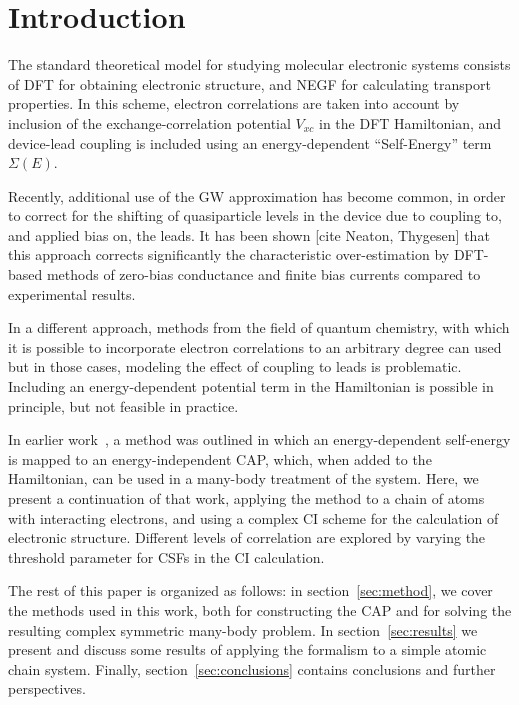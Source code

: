 \section{Introduction}

The standard theoretical model for studying molecular electronic systems
consists of \ac{DFT} for obtaining electronic structure, and \ac{NEGF} for
calculating transport properties. In this scheme, electron correlations are
taken into account by inclusion of the exchange-correlation potential $V_{xc}$
in the \ac{DFT} Hamiltonian, and device-lead coupling is included using an
energy-dependent ``Self-Energy'' term $\Sigma(E)$.

Recently, additional use of the GW approximation has become common, in order to
correct for the shifting of quasiparticle levels in the device due to coupling
to, and applied bias on, the leads. It has been shown [cite Neaton, Thygesen]
that this approach corrects significantly the characteristic over-estimation by
\ac{DFT}-based methods of zero-bias conductance and finite bias currents
compared to experimental results.

In a different approach, methods from the field of quantum chemistry, with
which it is possible to incorporate electron correlations to an arbitrary
degree can  used \cite{vici2004} but in those cases, modeling the effect of
coupling to leads is problematic. Including an energy-dependent potential term
in the Hamiltonian is possible in principle, but not feasible in practice.

In earlier work~\cite{henderson}, a method was outlined in which an
energy-dependent self-energy is mapped to an energy-independent
\ac{CAP}, which, when added to the Hamiltonian, can be used
in a many-body treatment of the system. Here, we present a continuation of that
work, applying the method to a chain of atoms with interacting electrons, and
using a complex \ac{CI} scheme for the calculation of electronic structure.
Different levels of correlation are explored by varying the threshold
parameter for \acp{CSF} in the \ac{CI} calculation.

The rest of this paper is organized as follows: in section~\ref{sec:method}, we
cover the methods used in this work, both for constructing the \ac{CAP} and for
solving the resulting complex symmetric many-body problem. In
section~\ref{sec:results} we present and discuss some results of applying the
formalism to a simple atomic chain system. Finally,
section~\ref{sec:conclusions} contains conclusions and further perspectives.



